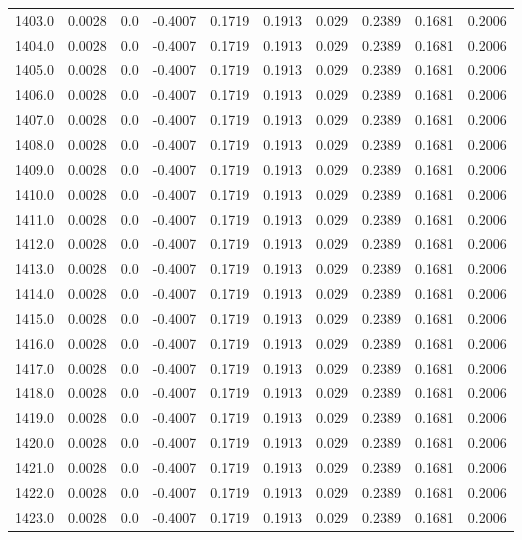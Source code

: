\begin{longtable}{lrrrrrrrrr}
1403.0 & 0.0028 & 0.0 & -0.4007 & 0.1719 & 0.1913 & 0.029 & 0.2389 & 0.1681 & 0.2006 \\
1404.0 & 0.0028 & 0.0 & -0.4007 & 0.1719 & 0.1913 & 0.029 & 0.2389 & 0.1681 & 0.2006 \\
1405.0 & 0.0028 & 0.0 & -0.4007 & 0.1719 & 0.1913 & 0.029 & 0.2389 & 0.1681 & 0.2006 \\
1406.0 & 0.0028 & 0.0 & -0.4007 & 0.1719 & 0.1913 & 0.029 & 0.2389 & 0.1681 & 0.2006 \\
1407.0 & 0.0028 & 0.0 & -0.4007 & 0.1719 & 0.1913 & 0.029 & 0.2389 & 0.1681 & 0.2006 \\
1408.0 & 0.0028 & 0.0 & -0.4007 & 0.1719 & 0.1913 & 0.029 & 0.2389 & 0.1681 & 0.2006 \\
1409.0 & 0.0028 & 0.0 & -0.4007 & 0.1719 & 0.1913 & 0.029 & 0.2389 & 0.1681 & 0.2006 \\
1410.0 & 0.0028 & 0.0 & -0.4007 & 0.1719 & 0.1913 & 0.029 & 0.2389 & 0.1681 & 0.2006 \\
1411.0 & 0.0028 & 0.0 & -0.4007 & 0.1719 & 0.1913 & 0.029 & 0.2389 & 0.1681 & 0.2006 \\
1412.0 & 0.0028 & 0.0 & -0.4007 & 0.1719 & 0.1913 & 0.029 & 0.2389 & 0.1681 & 0.2006 \\
1413.0 & 0.0028 & 0.0 & -0.4007 & 0.1719 & 0.1913 & 0.029 & 0.2389 & 0.1681 & 0.2006 \\
1414.0 & 0.0028 & 0.0 & -0.4007 & 0.1719 & 0.1913 & 0.029 & 0.2389 & 0.1681 & 0.2006 \\
1415.0 & 0.0028 & 0.0 & -0.4007 & 0.1719 & 0.1913 & 0.029 & 0.2389 & 0.1681 & 0.2006 \\
1416.0 & 0.0028 & 0.0 & -0.4007 & 0.1719 & 0.1913 & 0.029 & 0.2389 & 0.1681 & 0.2006 \\
1417.0 & 0.0028 & 0.0 & -0.4007 & 0.1719 & 0.1913 & 0.029 & 0.2389 & 0.1681 & 0.2006 \\
1418.0 & 0.0028 & 0.0 & -0.4007 & 0.1719 & 0.1913 & 0.029 & 0.2389 & 0.1681 & 0.2006 \\
1419.0 & 0.0028 & 0.0 & -0.4007 & 0.1719 & 0.1913 & 0.029 & 0.2389 & 0.1681 & 0.2006 \\
1420.0 & 0.0028 & 0.0 & -0.4007 & 0.1719 & 0.1913 & 0.029 & 0.2389 & 0.1681 & 0.2006 \\
1421.0 & 0.0028 & 0.0 & -0.4007 & 0.1719 & 0.1913 & 0.029 & 0.2389 & 0.1681 & 0.2006 \\
1422.0 & 0.0028 & 0.0 & -0.4007 & 0.1719 & 0.1913 & 0.029 & 0.2389 & 0.1681 & 0.2006 \\
1423.0 & 0.0028 & 0.0 & -0.4007 & 0.1719 & 0.1913 & 0.029 & 0.2389 & 0.1681 & 0.2006 \\

\end{longtable}
